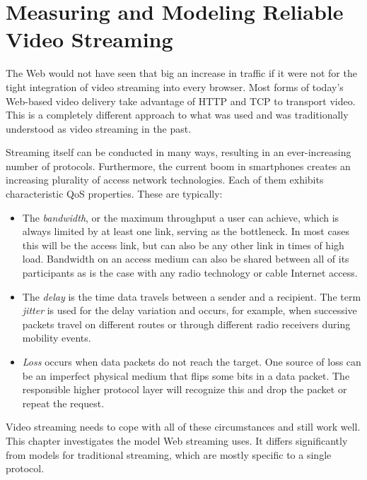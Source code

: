 \chapter{Measuring and Modeling Reliable Video Streaming}
\label{chap:streaming}

The Web would not have seen that big an increase in traffic if it were not for the tight integration of video streaming into every browser. 
Most forms of today's Web-based video delivery take advantage of \gls{HTTP} and \gls{TCP} to transport video. This is a completely different approach to what was used and was traditionally understood as video streaming in the past.

Streaming itself can be conducted in many ways, resulting in an ever-increasing number of protocols. Furthermore, the current boom in smartphones creates an increasing plurality of access network technologies. Each of them exhibits characteristic \gls{QoS} properties. These are typically:

\begin{itemize}
	\item The \textit{bandwidth}, or the maximum throughput a user can achieve, which is always limited by at least one link, serving as the bottleneck. In most cases this will be the access link, but can also be any other link in times of high load. Bandwidth on an access medium can also be shared between all of its participants as is the case with any radio technology or cable Internet access.

	\item The \textit{delay} is the time data travels between a sender and a recipient. The term \textit{jitter} is used  for the delay variation and occurs, for example, when successive packets travel on different routes or through different radio receivers during mobility events.

	\item \textit{Loss} occurs when data packets do not reach the target. One source of loss can be an imperfect physical medium that flips some bits in a data packet. The responsible higher protocol layer will recognize this and drop the packet or repeat the request.
\end{itemize}

Video streaming needs to cope with all of these circumstances and still work well. This chapter investigates the model Web streaming uses. It differs significantly from models for traditional streaming, which are mostly specific to a single protocol.


